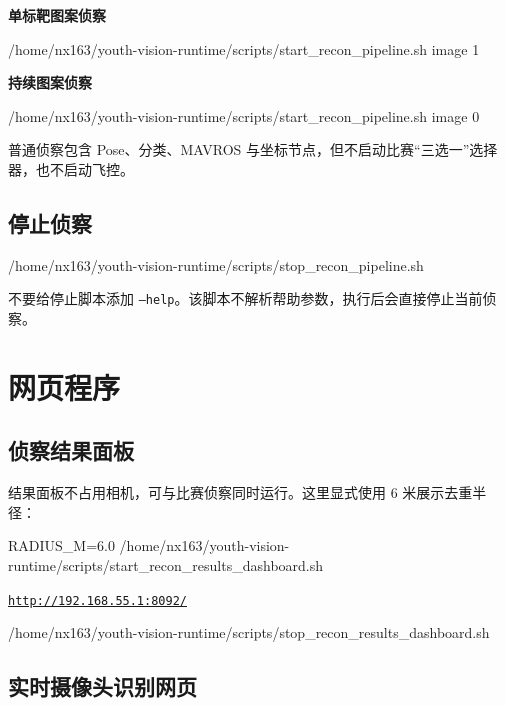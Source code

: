 \documentclass[11pt,a4paper]{article}
\begin{document}
\textbf{单标靶图案侦察}
\begin{commandbox}
/home/nx163/youth-vision-runtime/scripts/start_recon_pipeline.sh image 1
\end{commandbox}

\textbf{持续图案侦察}
\begin{commandbox}
/home/nx163/youth-vision-runtime/scripts/start_recon_pipeline.sh image 0
\end{commandbox}

普通侦察包含 Pose、分类、MAVROS 与坐标节点，但不启动比赛“三选一”选择器，也不启动飞控。

\subsection{停止侦察}
\begin{commandbox}
/home/nx163/youth-vision-runtime/scripts/stop_recon_pipeline.sh
\end{commandbox}

\begin{warnbox}
不要给停止脚本添加 \texttt{--help}。该脚本不解析帮助参数，执行后会直接停止当前侦察。
\end{warnbox}

\Needspace{72mm}
\section{网页程序}

\subsection{侦察结果面板}

结果面板不占用相机，可与比赛侦察同时运行。这里显式使用 6 米展示去重半径：

\begin{commandbox}
RADIUS_M=6.0 /home/nx163/youth-vision-runtime/scripts/start_recon_results_dashboard.sh
\end{commandbox}

\begin{center}
\href{http://192.168.55.1:8092/}{\texttt{http://192.168.55.1:8092/}}
\end{center}

\begin{commandbox}
/home/nx163/youth-vision-runtime/scripts/stop_recon_results_dashboard.sh
\end{commandbox}

\subsection{实时摄像头识别网页}
\end{document}

